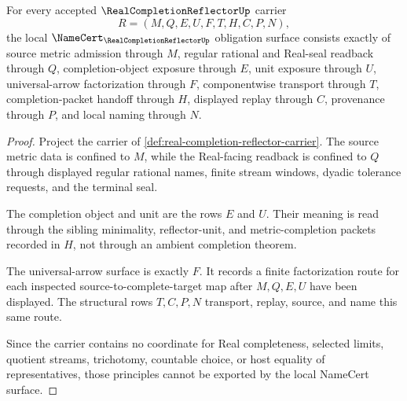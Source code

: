 \begin{theorem}
\label{thm:real-completion-reflector-namecert-obligations}
For every accepted $\RealCompletionReflectorUp$ carrier
$$
R=(M,Q,E,U,F,T,H,C,P,N),
$$
the local $\NameCert_{\RealCompletionReflectorUp}$ obligation surface consists exactly of source metric admission through $M$, regular rational and Real-seal readback through $Q$, completion-object exposure through $E$, unit exposure through $U$, universal-arrow factorization through $F$, componentwise transport through $T$, completion-packet handoff through $H$, displayed replay through $C$, provenance through $P$, and local naming through $N$.
\end{theorem}
\begin{proof}
Project the carrier of \autoref{def:real-completion-reflector-carrier}. The source metric data is confined to $M$, while the Real-facing readback is confined to $Q$ through displayed regular rational names, finite stream windows, dyadic tolerance requests, and the terminal seal.

The completion object and unit are the rows $E$ and $U$. Their meaning is read through the sibling minimality, reflector-unit, and metric-completion packets recorded in $H$, not through an ambient completion theorem.

The universal-arrow surface is exactly $F$. It records a finite factorization route for each inspected source-to-complete-target map after $M,Q,E,U$ have been displayed. The structural rows $T,C,P,N$ transport, replay, source, and name this same route.

Since the carrier contains no coordinate for Real completeness, selected limits, quotient streams, trichotomy, countable choice, or host equality of representatives, those principles cannot be exported by the local NameCert surface.
\end{proof}

